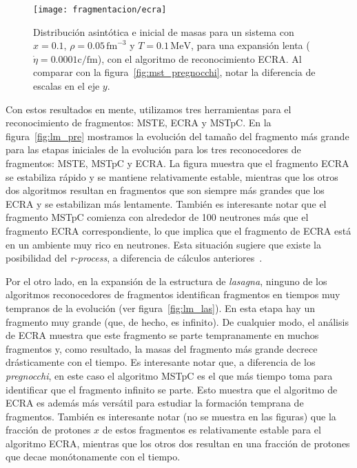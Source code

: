 \begin{figure}
  \texttt{[image: fragmentacion/ecra]}
  \caption{Distribución asintótica e inicial de masas para un sistema con $x = 0.1$, $\rho = 0.05\,\text{fm}^{-3}$ y $T = 0.1\,\text{MeV}$, para una expansión lenta ($\dot{\eta} = 0.0001\text{c/fm}$), con el algoritmo de reconocimiento ECRA. Al comparar con la figura~\ref{fig:mst_pregnocchi}, notar la diferencia de escalas en el eje $y$.}
\label{fig:ecra_pregnocchi}
\end{figure}

Con estos resultados en mente, utilizamos tres herramientas para el reconocimiento de fragmentos: MSTE, ECRA y MSTpC.
En la figura~\ref{fig:lm_pre} mostramos la evolución del tamaño del fragmento más grande para las etapas iniciales de la evolución para los tres reconocedores de fragmentos: MSTE, MSTpC y ECRA.\@
La figura muestra que el fragmento ECRA se estabiliza rápido y se mantiene relativamente estable, mientras que los otros dos algoritmos resultan en fragmentos que son siempre más grandes que los ECRA y se estabilizan más lentamente.
También es interesante notar que el fragmento MSTpC comienza con alrededor de 100 neutrones más que el fragmento ECRA correspondiente, lo que implica que el fragmento de ECRA está en un ambiente muy rico en neutrones.
Esta situación sugiere que existe la posibilidad del \emph{r-process}, a diferencia de cálculos anteriores~\cite{caplan_pasta_2015}.

Por el otro lado, en la expansión de la estructura de \emph{lasagna}, ninguno de los algoritmos reconocedores de fragmentos identifican fragmentos en tiempos muy tempranos de la evolución (ver figura~\ref{fig:lm_las}).
En esta etapa hay un fragmento muy grande (que, de hecho, es infinito).
De cualquier modo, el análisis de ECRA muestra que este fragmento se parte tempranamente en muchos fragmentos y, como resultado, la masas del fragmento más grande decrece drásticamente con el tiempo.
Es interesante notar que, a diferencia de los \emph{pregnocchi}, en este caso el algoritmo MSTpC es el que más tiempo toma para identificar que el fragmento infinito se parte.
Esto muestra que el algoritmo de ECRA es además más versátil para estudiar la formación temprana de fragmentos.
También es interesante notar (no se muestra en las figuras) que la fracción de protones $x$ de estos fragmentos es relativamente estable para el algoritmo ECRA, mientras que los otros dos resultan en una fracción de protones que decae monótonamente con el tiempo.

